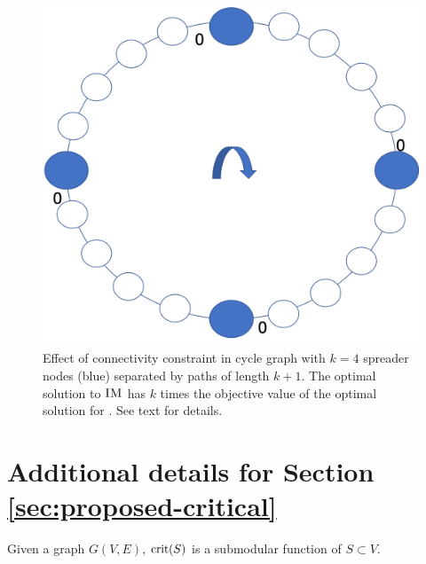 \begin{figure}
    \centering
    \includegraphics[width=.7\columnwidth]{img/observation.png}
    \caption{Effect of connectivity constraint in cycle graph with $k=4$ spreader nodes (blue) separated by paths of length $k + 1$. The optimal solution to $\textsc{IM}{}$ has $k$ times the objective value of the optimal solution for \maxcrit{}. See text for details.}
    \label{fig:observation-app}
\end{figure}

\section{Additional details for Section \ref{sec:proposed-critical}}
\begin{lemma}
Given a graph $G(V, E)$, $\text{crit}(S)$ is a submodular function of $S \subset V$.
\end{lemma}

